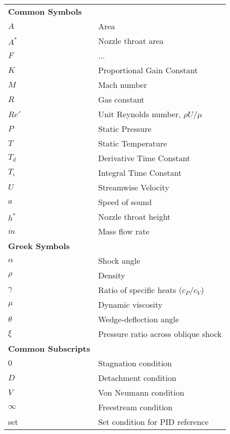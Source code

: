 \begin{spacing}{1.0}
\begin{longtable}[htbp]{@{}p{} p{}@{}}
        \textbf{Common Symbols}\\ [2ex] 
        $A$ & Area \\ [2ex]
        $A^*$ & Nozzle throat area \\ [2ex]
        $F$ & ...\\ [2ex]
        $K$ & Proportional Gain Constant \\ [2ex]
        $M$ & Mach number\\ [2ex]
        $R$ & Gas constant\\ [2ex]
        $Re'$ & Unit Reynolds number, $\rho U/\mu$\\ [2ex]
        $P$ & Static Pressure\\ [2ex]
        $T$ & Static Temperature\\ [2ex]
        $T_d$ & Derivative Time Constant\\ [2ex]
        $T_i$ & Integral Time Constant\\ [2ex]
        $U$ & Streamwise Velocity\\ [2ex]
        $a$ & Speed of sound\\ [2ex]
        $h^*$ & Nozzle throat height\\ [2ex]
        $\dot{m}$ & Mass flow rate\\ [2ex]

        \textbf{Greek Symbols}\\ [2ex] 
        $\alpha$ & Shock angle\\ [2ex]
        $\rho$ & Density\\ [2ex]
        $\gamma$ & Ratio of specific heats ($c_P/c_V$) \\ [2ex]
        $\mu$ & Dynamic viscosity\\ [2ex]
        $\theta$ & Wedge-deflection angle \\ [2ex]
        $\xi$ & Pressure ratio across oblique shock\\ [2ex]

        \textbf{Common Subscripts}\\ [2ex] 
        $0$ & Stagnation condition\\ [2ex] 
        $D$ & Detachment condition\\ [2ex]
        $V$ & Von Neumann condition\\ [2ex]
        $\infty$ & Freestream condition\\ [2ex]
        set & Set condition for PID reference\\ [2ex]


	\end{longtable}
\end{spacing}

\pagebreak{}
